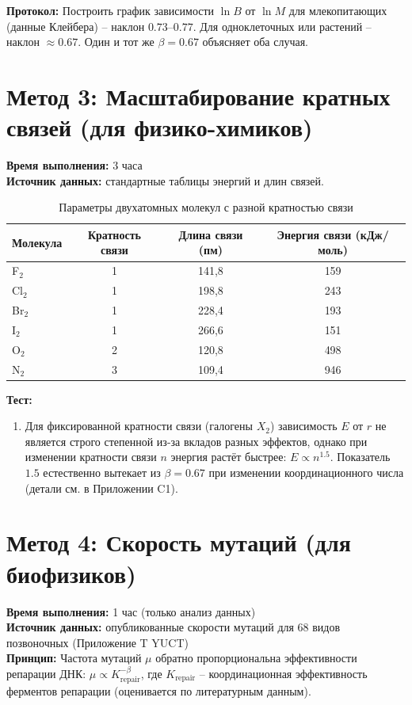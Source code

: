 \documentclass[12pt,a4paper]{article}
\begin{document}
	\textbf{Протокол:} Построить график зависимости $\ln B$ от $\ln M$ для млекопитающих (данные Клейбера) – наклон $0.73$–$0.77$. Для одноклеточных или растений – наклон $\approx 0.67$. Один и тот же $\beta = 0.67$ объясняет оба случая.
	
	\section{Метод 3: Масштабирование кратных связей (для физико-химиков)}
	
	\textbf{Время выполнения:} 3 часа \\
	\textbf{Источник данных:} стандартные таблицы энергий и длин связей.
	
	\begin{table}[h]
		\centering
		\caption{Параметры двухатомных молекул с разной кратностью связи}
		\label{tab:multibond}
		\begin{tabular}{lccc}
			\toprule
			Молекула & Кратность связи & Длина связи (пм) & Энергия связи (кДж/моль) \\
			\midrule
			F$_2$ & 1 & 141,8 & 159 \\
			Cl$_2$ & 1 & 198,8 & 243 \\
			Br$_2$ & 1 & 228,4 & 193 \\
			I$_2$ & 1 & 266,6 & 151 \\
			O$_2$ & 2 & 120,8 & 498 \\
			N$_2$ & 3 & 109,4 & 946 \\
			\bottomrule
		\end{tabular}
	\end{table}
	
	\textbf{Тест:}
	\begin{enumerate}
		\item Для фиксированной кратности связи (галогены $X_2$) зависимость $E$ от $r$ не является строго степенной из-за вкладов разных эффектов, однако при изменении кратности связи $n$ энергия растёт быстрее: $E \propto n^{1.5}$. Показатель $1.5$ естественно вытекает из $\beta = 0.67$ при изменении координационного числа (детали см. в Приложении C1).
	\end{enumerate}
	
	\section{Метод 4: Скорость мутаций (для биофизиков)}
	
	\textbf{Время выполнения:} 1 час (только анализ данных) \\
	\textbf{Источник данных:} опубликованные скорости мутаций для 68 видов позвоночных (Приложение T YUCT) \\
	\textbf{Принцип:} Частота мутаций $\mu$ обратно пропорциональна эффективности репарации ДНК: $\mu \propto K_{\text{repair}}^{-\beta}$, где $K_{\text{repair}}$ – координационная эффективность ферментов репарации (оценивается по литературным данным).
	
\end{document}
